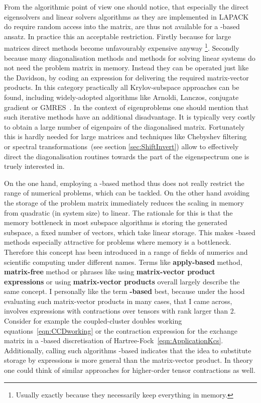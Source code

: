 From the algorithmic point of view one should notice,
that especially the direct eigensolvers and linear solvers algorithms
as they are implemented in LAPACK\cite{LAPACK}
do require random access into the matrix,
are thus not available for a \contraction-based ansatz.
In practice this an acceptable restriction.
Firstly because for large matrices direct methods become
unfavourably expensive anyway%
\footnote{Usually exactly because they necessarily keep everything in memory.}.
Secondly because many diagonalisation methods and methods for solving linear systems
do not need the problem matrix in memory.
Instead they can be operated just like the Davidson,
by coding an expression for delivering the required matrix-vector products.
In this category practically all Krylov-subspace approaches can be found,
including widely-adopted algorithms like
Arnoldi, Lanczos, conjugate gradient or GMRES~\cite{Saad2003,Arbenz2010,Saad2011}.
In the context of eigenproblems
one should mention that such iterative methods
have an additional disadvantage.
It is typically very costly to obtain a large number of eigenpairs
of the diagonalised matrix.
Fortunately this is hardly needed for large matrices
and techniques like Chebyshev filtering~\cite{Teng2016,Pieper2016,Zhou2014}
or spectral transformations~(see section \vref{sec:ShiftInvert})
allow to effectively direct the diagonalisation routines
towards the part of the eigenspectrum one is truely interested in.

On the one hand, employing a \contraction-based method thus does not really
restrict the range of numerical problems, which can be tackled.
On the other hand avoiding the storage of the problem matrix
immediately reduces the scaling in memory from quadratic (in system size) to linear.
The rationale for this is that the memory bottleneck
in most subspace algorithms is storing the generated subspace,
\ie a fixed number of vectors, which take linear storage.
This makes \contraction-based methods especially
attractive for problems where memory is a bottleneck.
Therefore this concept has been
introduced in a range of fields of numerics and scientific computing
under different names.
Terms like \textbf{apply-based} method, \textbf{matrix-free} method
or phrases like using \textbf{matrix-vector product expressions}
or using \textbf{matrix-vector products}
overall largely describe the same concept.
I personally like the term \textbf{\contraction-based} best,
because under the hood
evaluating such matrix-vector products in many cases,
that I came across,
involves expressions with contractions over tensors with rank larger than 2.
Consider for example the coupled-cluster doubles working equations~\eqref{eqn:CCDworking}
or the contraction expression for the exchange matrix
in a \CS-based discretisation of Hartree-Fock~\eqref{eqn:ApplicationKcs}.
Additionally, calling such algorithms \contraction-based
indicates that the idea to substitute storage by expressions
is more general than the matrix-vector product.
In theory one could think of similar approaches for
higher-order tensor contractions as well.

